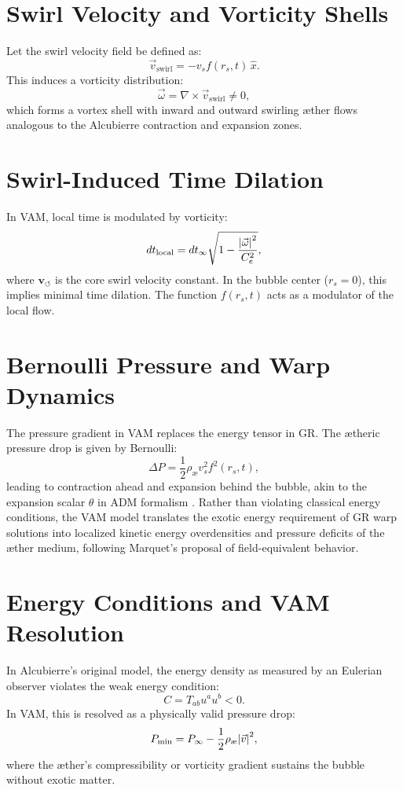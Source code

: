 \documentclass[12pt]{article}
\begin{document}
\section{Swirl Velocity and Vorticity Shells}
Let the swirl velocity field be defined as:
\begin{equation}
    \vec{v}_{\text{swirl}} = -v_s f(r_s, t)\, \hat{x}.
\end{equation}
This induces a vorticity distribution:
\begin{equation}
    \vec{\omega} = \nabla \times \vec{v}_{\text{swirl}} \neq 0,
\end{equation}
which forms a vortex shell with inward and outward swirling æther flows analogous to the Alcubierre contraction and expansion zones.

\section{Swirl-Induced Time Dilation}
In VAM, local time is modulated by vorticity:
\begin{equation}
    dt_{\text{local}} = dt_{\infty} \sqrt{1 - \frac{\abs{\vec{\omega}}^2}{C_e^2}},
\end{equation}
where \( \mathbf{v}_{\scriptscriptstyle\boldsymbol{\circlearrowleft}} \) is the core swirl velocity constant. In the bubble center (\( r_s = 0 \)), this implies minimal time dilation. The function \( f(r_s, t) \) acts as a modulator of the local flow.

\section{Bernoulli Pressure and Warp Dynamics}
The pressure gradient in VAM replaces the energy tensor in GR. The ætheric pressure drop is given by Bernoulli:
\begin{equation}
    \Delta P = \frac{1}{2} \rho_\text{\ae} v_s^2 f^2(r_s, t),
\end{equation}
leading to contraction ahead and expansion behind the bubble, akin to the expansion scalar \( \theta \) in ADM formalism \cite{marquet2009warp}.
Rather than violating classical energy conditions, the VAM model translates the exotic energy requirement of GR warp solutions into localized kinetic energy overdensities and pressure deficits of the æther medium, following Marquet's proposal of field-equivalent behavior.

\section{Energy Conditions and VAM Resolution}
In Alcubierre's original model, the energy density as measured by an Eulerian observer violates the weak energy condition:
\begin{equation}
    C = T_{ab} u^a u^b < 0.
\end{equation}
In VAM, this is resolved as a physically valid pressure drop:
\begin{equation}
    P_{\text{min}} = P_\infty - \frac{1}{2} \rho_\text{\ae} \abs{\vec{v}}^2,
\end{equation}
where the æther's compressibility or vorticity gradient sustains the bubble without exotic matter.
\end{document}
